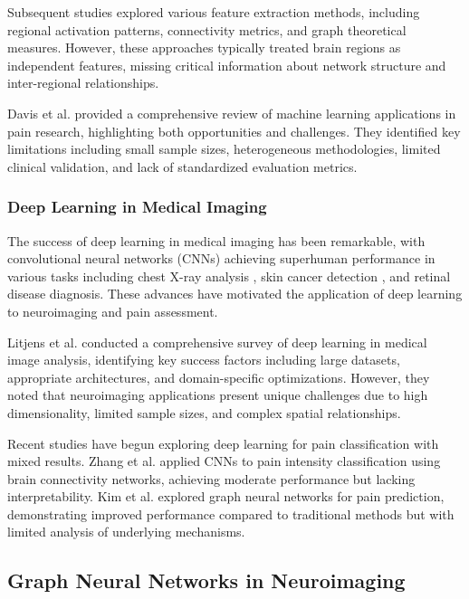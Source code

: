 \documentclass[10pt,journal,compsoc]{IEEEtran}
\begin{document}
Subsequent studies explored various feature extraction methods, including regional activation patterns, connectivity metrics, and graph theoretical measures. However, these approaches typically treated brain regions as independent features, missing critical information about network structure and inter-regional relationships.

Davis et al. \cite{davis2020machine} provided a comprehensive review of machine learning applications in pain research, highlighting both opportunities and challenges. They identified key limitations including small sample sizes, heterogeneous methodologies, limited clinical validation, and lack of standardized evaluation metrics.

\subsubsection{Deep Learning in Medical Imaging}

The success of deep learning in medical imaging has been remarkable, with convolutional neural networks (CNNs) achieving superhuman performance in various tasks including chest X-ray analysis \cite{rajpurkar2017chexnet}, skin cancer detection \cite{esteva2017dermatologist}, and retinal disease diagnosis. These advances have motivated the application of deep learning to neuroimaging and pain assessment.

Litjens et al. \cite{litjens2017survey} conducted a comprehensive survey of deep learning in medical image analysis, identifying key success factors including large datasets, appropriate architectures, and domain-specific optimizations. However, they noted that neuroimaging applications present unique challenges due to high dimensionality, limited sample sizes, and complex spatial relationships.

Recent studies have begun exploring deep learning for pain classification with mixed results. Zhang et al. \cite{zhang2022deep} applied CNNs to pain intensity classification using brain connectivity networks, achieving moderate performance but lacking interpretability. Kim et al. \cite{kim2023graph} explored graph neural networks for pain prediction, demonstrating improved performance compared to traditional methods but with limited analysis of underlying mechanisms.

\subsection{Graph Neural Networks in Neuroimaging}
\end{document}
